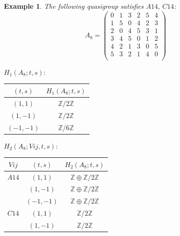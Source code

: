 \documentclass[11pt]{amsart}
\newtheorem{example}[theorem]{Example}
\theoremstyle{definition}
\newcommand{\Z}{\mathbb{Z}}
\begin{document}
\begin{example}
The following quasigroup satisfies 
$A14$, $C14$:
   \[ A_8 = \left( \begin{array}{cccccc}
    0 & 1 & 3 & 2 & 5 & 4 \\
    1 & 5 & 0 & 4 & 2 & 3 \\
    2 & 0 & 4 & 5 & 3 & 1 \\
    3 & 4 & 5 & 0 & 1 & 2 \\
    4 & 2 & 1 & 3 & 0 & 5 \\
    5 & 3 & 2 & 1 & 4 & 0 \\
\end{array} \right)\]


\bigskip


$H_1(A_8;t,s):$

\begin{center}
    
\begin{tabular}{c|c}
    $(t,s)$ & $H_1(A_8;t,s)$  \\
    \hline
    $(1,1)$ & $\Z/2\Z$ \\
    $(1,-1)$ & $\Z/2\Z$ \\
    $(-1,-1)$ & $\Z/6\Z$ \\
\end{tabular}
\end{center}
\bigskip

$H_2(A_8;Vij,t,s):$

\begin{center}
    
\begin{tabular}{c|c|c}
    $Vij$ & $(t,s)$ & $H_2(A_8;t,s)$  \\
    \hline

    $A14$ & $(1,1)$ & $\Z \oplus \Z/2\Z$ \\
        & $(1,-1)$ & $\Z \oplus \Z/2\Z$ \\
        & $(-1,-1)$ & $\Z \oplus \Z/2\Z$ \\
    $C14$ & $(1,1)$ & $\Z/2\Z$ \\
        & $(1,-1)$ & $\Z/2\Z$ \\
\end{tabular}

\end{center}

\end{example}
\end{document}
